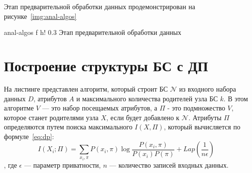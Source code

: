 Этап предварительной обработки данных продемонстрирован на рисунке~\ref{img:anal-algos}

{anal-algos} %
{f} %
{h!} %
{0.3\textwidth} %
{Этап предварительной обработки данных} %
\clearpage


\section{Построение структуры БС с ДП}

На листинге представлен алгоритм, который строит БС $\mathcal{N}$ из входного набора данных $D$, атрибутов $A$ и максимального количества родителей узла БС $k$. 
В этом алгоритме $V$ --- это набор посещаемых атрибутов, а $\Pi$ - это подмножество $V$, которое станет родителями узла $X$, если будет добавлено к $\mathcal{N}$.
Атрибуты $\Pi$ определяются путем поиска максимального $I(X , \Pi)$, который вычисляется по формуле~\ref{eq:dp}:
\begin{equation}\label{eq:dp}
	I(X_i; \Pi) = \sum_{x_i, \pi}^{} P(x_i, \pi) \log \frac{P(x_i, \pi)}{P(x_i) P(\pi)} + Lap(\frac{1}{n\epsilon})
\end{equation}
	, где $\epsilon$ --- параметр приватности, $n$ --- количество записей входных данных.





